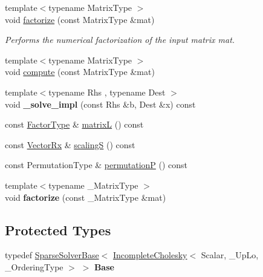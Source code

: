 \begin{DoxyCompactItemize}
{\footnotesize template$<$typename Matrix\+Type $>$ }\\void \mbox{\hyperlink{class_eigen_1_1_incomplete_cholesky_ac39c75ff7ca5d2db9a9f03b937e12601}{factorize}} (const Matrix\+Type \&mat)
\begin{DoxyCompactList}\small\item\em Performs the numerical factorization of the input matrix {\itshape mat}. \end{DoxyCompactList}\item 
{\footnotesize template$<$typename Matrix\+Type $>$ }\\void \mbox{\hyperlink{class_eigen_1_1_incomplete_cholesky_a7966bedeebbeaa7a8fe4dd1da3797a0b}{compute}} (const Matrix\+Type \&mat)
\item 
\mbox{\label{class_eigen_1_1_incomplete_cholesky_a7df2a13e73f1ac4a2fc7a6524bd93f84}} 
{\footnotesize template$<$typename Rhs , typename Dest $>$ }\\void {\bfseries \+\_\+solve\+\_\+impl} (const Rhs \&b, Dest \&x) const
\item 
const \mbox{\hyperlink{class_eigen_1_1_sparse_matrix}{Factor\+Type}} \& \mbox{\hyperlink{class_eigen_1_1_incomplete_cholesky_a7d1f1878505fd1862e6f2286d27ff09a}{matrixL}} () const
\item 
const \mbox{\hyperlink{class_eigen_1_1_matrix}{Vector\+Rx}} \& \mbox{\hyperlink{class_eigen_1_1_incomplete_cholesky_a30d66dd77147a84ec3302e7d5fe5d924}{scalingS}} () const
\item 
const Permutation\+Type \& \mbox{\hyperlink{class_eigen_1_1_incomplete_cholesky_a0d52cec5e17f485a362766363ba90b02}{permutationP}} () const
\item 
\mbox{\label{class_eigen_1_1_incomplete_cholesky_ae218a158db71382db2ed5e01e9ba0bc0}} 
{\footnotesize template$<$typename \+\_\+\+Matrix\+Type $>$ }\\void {\bfseries factorize} (const \+\_\+\+Matrix\+Type \&mat)
\end{DoxyCompactItemize}
\subsection*{Protected Types}
\begin{DoxyCompactItemize}
\item 
\mbox{\label{class_eigen_1_1_incomplete_cholesky_a954c3b3807af067ab2f2440e8cb3e751}} 
typedef \mbox{\hyperlink{class_eigen_1_1_sparse_solver_base}{Sparse\+Solver\+Base}}$<$ \mbox{\hyperlink{class_eigen_1_1_incomplete_cholesky}{Incomplete\+Cholesky}}$<$ Scalar, \+\_\+\+Up\+Lo, \+\_\+\+Ordering\+Type $>$ $>$ {\bfseries Base}
\end{DoxyCompactItemize}

